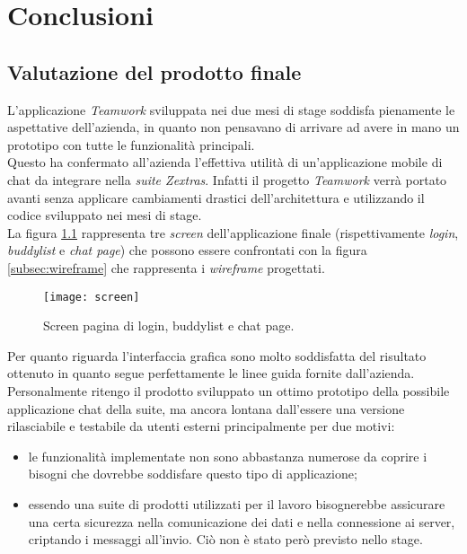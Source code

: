 
\chapter{Conclusioni}\label{chap:conclusions}
\section{Valutazione del prodotto finale}
L’applicazione \emph{Teamwork} sviluppata nei due mesi di stage soddisfa pienamente le aspettative dell’azienda, in quanto non pensavano di arrivare ad avere in mano un prototipo con tutte le funzionalità principali. \\
Questo ha confermato all'azienda l'effettiva utilità di un'applicazione mobile di chat da integrare nella \emph{suite Zextras}. Infatti il progetto \emph{Teamwork} verrà portato avanti senza applicare cambiamenti drastici dell'architettura e utilizzando il codice sviluppato nei mesi di stage.\\
La figura \ref{sec:valutazione} rappresenta tre \emph{screen} dell'applicazione finale (rispettivamente \emph{login}, \emph{buddylist} e\emph{ chat page}) che possono essere confrontati con la figura \ref{subsec:wireframe} che rappresenta i \emph{wireframe} progettati.
\begin{figure}[H] 
	\centering
	\texttt{[image: screen]}
	\caption{Screen pagina di login, buddylist e chat page.}
	\label{sec:valutazione}
\end{figure}
Per quanto riguarda l'interfaccia grafica sono molto soddisfatta del risultato ottenuto in quanto segue perfettamente le linee guida fornite dall'azienda. \\
Personalmente ritengo il prodotto sviluppato un ottimo prototipo della possibile applicazione chat della suite, ma ancora lontana dall'essere una versione rilasciabile e testabile da utenti esterni principalmente per due motivi:
\begin{itemize}
	\item le funzionalità implementate non sono abbastanza numerose da coprire i bisogni che dovrebbe soddisfare questo tipo di applicazione;
	\item essendo una suite di prodotti utilizzati per il lavoro bisognerebbe assicurare una certa sicurezza nella comunicazione dei dati e nella connessione ai server, criptando i messaggi all'invio. Ciò non è stato però
	previsto nello stage.
\end{itemize}

